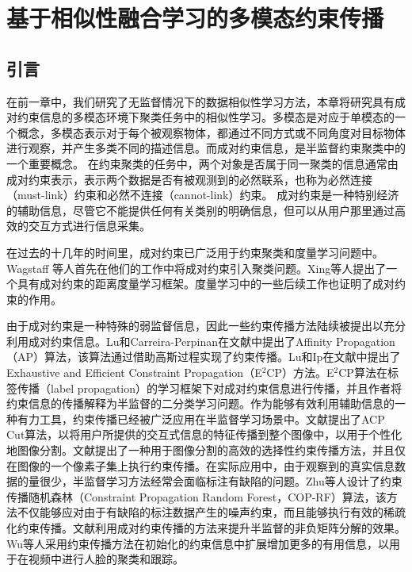 \chapter{基于相似性融合学习的多模态约束传播}
\section{引言}
\label{sec3:intro} 
在前一章中，我们研究了无监督情况下的数据相似性学习方法，本章将研究具有成对约束信息的多模态环境下聚类任务中的相似性学习。多模态是对应于单模态的一个概念，多模态表示对于每个被观察物体，都通过不同方式或不同角度对目标物体进行观察，并产生多类不同的描述信息。而成对约束信息，是半监督约束聚类中的一个重要概念。
在约束聚类的任务中，两个对象是否属于同一聚类的信息通常由成对约束表示，表示两个数据是否有被观测到的必然联系，也称为必然连接（must-link）约束和必然不连接（cannot-link）约束。 成对约束是一种特别经济的辅助信息，尽管它不能提供任何有关类别的明确信息，但可以从用户那里通过高效的交互方式进行信息采集。

在过去的十几年的时间里，成对约束已广泛用于约束聚类和度量学习问题中。Wagstaff 等人首先在他们的工作中将成对约束引入聚类问题\cite{wagstaff2000clustering,wagstaff2001constrained}。Xing等人提出了一个具有成对约束的距离度量学习框架\cite{xing2002distance}。度量学习中的一些后续工作也证明了成对约束的作用\cite{weinberger2005distance,davis2007information}。

由于成对约束是一种特殊的弱监督信息，因此一些约束传播方法\cite{lu2008constrained,lu2010constrained,fu2011symmetric}陆续被提出以充分利用成对约束信息。Lu和Carreira-Perpinan在文献\parencite{lu2008constrained}中提出了Affinity Propagation（AP）算法，该算法通过借助高斯过程实现了约束传播。Lu和Ip在文献\parencite{lu2010constrained}中提出了Exhaustive and Efficient Constraint Propagation（E$^2$CP）方法。E$^2$CP算法在标签传播（label propagation）\cite{zhou2004learning}的学习框架下对成对约束信息进行传播，并且作者将约束信息的传播解释为半监督的二分类学习问题。作为能够有效利用辅助信息的一种有力工具，约束传播已经被广泛应用在半监督学习场景中。文献\parencite{jian2016interactive}提出了ACP Cut算法，以将用户所提供的交互式信息的特征传播到整个图像中，以用于个性化地图像分割。文献\parencite{han2016segmentation}提出了一种用于图像分割的高效的选择性约束传播方法，并且仅在图像的一个像素子集上执行约束传播。在实际应用中，由于观察到的真实信息数据的量很少，半监督学习方法经常会面临标注有缺陷的问题。Zhu等人设计了约束传播随机森林（Constraint Propagation Random Forest，COP-RF）算法\cite {zhu2016constrained}，该方法不仅能够应对由于有缺陷的标注数据产生的噪声约束，而且能够执行有效的稀疏化约束传播。文献\parencite{wang2016semi}利用成对约束传播的方法来提升半监督的非负矩阵分解的效果。Wu等人采用约束传播方法在初始化的约束信息中扩展增加更多的有用信息，以用于在视频中进行人脸的聚类和跟踪\cite{wu2017coupled}。

